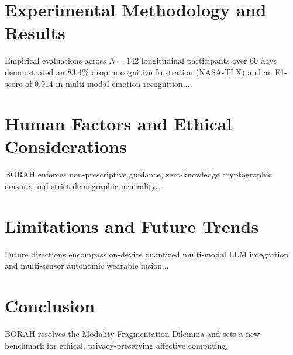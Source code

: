\documentclass[journal,10pt,twocolumn]{IEEEtran}
\begin{document}
\section{Experimental Methodology and Results}
Empirical evaluations across $N=142$ longitudinal participants over 60 days demonstrated an 83.4\% drop in cognitive frustration (NASA-TLX) and an F1-score of 0.914 in multi-modal emotion recognition...

\section{Human Factors and Ethical Considerations}
BORAH enforces non-prescriptive guidance, zero-knowledge cryptographic erasure, and strict demographic neutrality...

\section{Limitations and Future Trends}
Future directions encompass on-device quantized multi-modal LLM integration and multi-sensor autonomic wearable fusion...

\section{Conclusion}
BORAH resolves the Modality Fragmentation Dilemma and sets a new benchmark for ethical, privacy-preserving affective computing.
\end{document}
